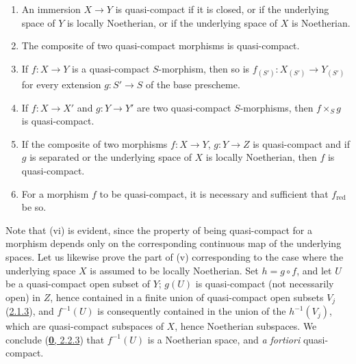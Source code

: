 \begin{proposition}[6.6.4]
\label{I.6.6.4}
\begin{enumerate}
  \item[\textup{(i)}] An immersion $X\to Y$ is quasi-compact if it is closed, or if the
    underlying space of $Y$ is locally Noetherian, or if the underlying space
    of $X$ is Noetherian.
  \item[\textup{(ii)}] The composite of two quasi-compact morphisms is quasi-compact.
  \item[\textup{(iii)}] If $f:X\to Y$ is a quasi-compact $S$-morphism, then so is
    $f_{(S')}:X_{(S')}\to Y_{(S')}$ for every extension $g:S'\to S$
    of the base prescheme.
  \item[\textup{(iv)}] If $f:X\to X'$ and $g:Y\to Y'$ are two quasi-compact
    $S$-morphisms, then $f\times_S g$ is quasi-compact.
  \item[\textup{(v)}] If the composite of two morphisms $f:X\to Y$, $g:Y\to Z$ is
    quasi-compact and if $g$ is separated or the underlying space of $X$ is
    locally Noetherian, then $f$ is quasi-compact.
  \item[\textup{(vi)}] For a morphism $f$ to be quasi-compact, it is necessary and
    sufficient that $f_{\mathrm{red}}$ be so.
\end{enumerate}
\end{proposition}

Note that (vi) is evident, since the property of being quasi-compact for a
morphism depends only on the corresponding continuous map of the underlying
spaces. Let us likewise prove the part of (v) corresponding to the case where
the underlying space $X$ is assumed to be locally Noetherian. Set
$h=g\circ f$, and let $U$ be a quasi-compact open subset of $Y$; $g(U)$ is
quasi-compact (not necessarily open) in $Z$, hence contained in a finite union
of quasi-compact open subsets $V_j$
(\hyperref[I.2.1.3]{2.1.3}), and $f^{-1}(U)$ is consequently contained in
the union of the $h^{-1}(V_j)$, which are quasi-compact subspaces of $X$,
hence Noetherian subspaces. We conclude
(\hyperref[0.2.2.3]{\textbf{0}, 2.2.3}) that $f^{-1}(U)$ is a Noetherian space,
and \emph{a fortiori} quasi-compact.

